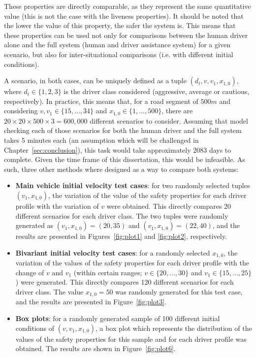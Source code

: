 These properties are directly comparable, as they represent the same quantitative value (this is not the case with the liveness properties). It should be noted that the lower the value of this property, the safer the system is. This means that these properties can be used not only for comparisons between the human driver alone and the full system (human and driver assistance system) for a given scenario, but also for inter-situational comparisons (i.e. with different initial conditions).

A scenario, in both cases, can be uniquely defined as a tuple $(d_t, v, v_1, x_{1,0})$, where $d_t \in \{1,2,3\}$ is the driver class considered (aggressive, average or cautious, respectively). In practice, this means that, for a road segment of $500m$ and considering $v, v_1 \in \{15,...,34\}$ and $x_{1,0} \in \{1,...,500\}$, there are $20 \times 20 \times 500 \times 3 = 600,000$ different scenarios to consider. Assuming that model checking each of those scenarios for both the human driver and the full system takes 5 minutes each (an assumption which will be challenged in Chapter~\ref{sec:conclusion}), this task would take approximately 2083 days to complete. Given the time frame of this dissertation, this would be infeasible. As such, three other methods where designed as a way to compare both systems: 

\begin{itemize}
	\item \textbf{Main vehicle initial velocity test cases}: for two randomly selected tuples $(v_1, x_{1,0})$, the variation of the value of the safety properties for each driver profile with the variation of $v$ were obtained. This directly compares 20 different scenarios for each driver class. The two tuples were randomly generated as $(v_1, x_{1,0}) = (20, 35)$ and $(v_1, x_{1,0}) = (22, 40)$, and the results are presented in Figures~\ref{fig:plot1} and \ref{fig:plot2}, respectively.
	\item \textbf{Bivariant initial velocity test cases}: for a randomly selected $x_{1,0}$, the variation of the values of the safety properties for each driver profile with the change of $v$ and $v_1$ (within certain ranges; $v \in \{20,...,30\}$ and $v_1\in \{15,...,25\}$) were generated. This directly compares 120 different scenarios for each driver class. The value $x_{1,0} = 50$ was randomly generated for this test case, and the results are presented in Figure~\ref{fig:plot3}.
	\item \textbf{Box plots}: for a randomly generated sample of 100 different initial conditions of $(v, v_1, x_{1,0})$, a box plot which represents the distribution of the values of the safety properties for this sample and for each driver profile was obtained. The results are shown in Figure~\ref{fig:plot6}.
\end{itemize}

